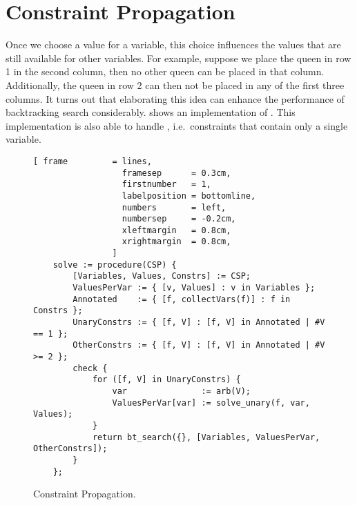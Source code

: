 \section{Constraint Propagation}
Once we choose a value for a variable, this choice influences the values that are still available for other variables.
For example, suppose we place the queen in row 1 in the second column, then no other queen can be placed in
that column.   Additionally, the queen in row 2 can then not be placed in any of the first three columns.
It turns out that elaborating this idea can enhance the performance of backtracking search considerably.
 shows an implementation of .
This implementation is also able to handle , i.e.~constraints that contain
only a single variable.

\begin{figure}[!ht]
\centering
\begin{Verbatim}[ frame         = lines, 
                  framesep      = 0.3cm, 
                  firstnumber   = 1,
                  labelposition = bottomline,
                  numbers       = left,
                  numbersep     = -0.2cm,
                  xleftmargin   = 0.8cm,
                  xrightmargin  = 0.8cm,
                ]
    solve := procedure(CSP) {
        [Variables, Values, Constrs] := CSP;
        ValuesPerVar := { [v, Values] : v in Variables };
        Annotated    := { [f, collectVars(f)] : f in Constrs };
        UnaryConstrs := { [f, V] : [f, V] in Annotated | #V == 1 };
        OtherConstrs := { [f, V] : [f, V] in Annotated | #V >= 2 };
        check {
            for ([f, V] in UnaryConstrs) {
                var               := arb(V);
                ValuesPerVar[var] := solve_unary(f, var, Values);
            }
            return bt_search({}, [Variables, ValuesPerVar, OtherConstrs]);
        }
    };
\end{Verbatim}
\vspace*{-0.3cm}
\caption{Constraint Propagation.}
\label{fig:csp-constraint-propagation.stlx-1}
\end{figure}

